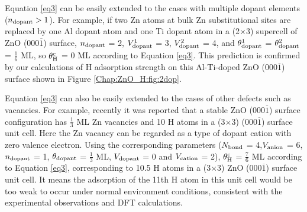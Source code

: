 Equation \ref{eq3} can be easily extended to the cases with multiple dopant elements ($n_{\textup{dopant}} > 1$). For example, if two Zn atoms at bulk Zn substitutional sites are replaced by one Al dopant atom and one Ti dopant atom in a (2$\times$3) supercell of ZnO (000$\overline{1}$) surface, $n_{\textup{dopant}}$ = 2,  $V_{\textup{dopant}}^1$ = 3, $V_{\textup{dopant}}^2$ = 4, and $\theta_{\textup{dopant}}^1$ = $\theta_{\textup{dopant}}^2$ = $\frac{1}{6}$ ML,  so $\theta_{\textup{H}}^{\textup{c}}$ = 0 ML according to Equation \ref{eq3}. This prediction is confirmed by our calculations of H adsorption strength on this Al-Ti-doped ZnO (000$\overline{1}$) surface shown in Figure \ref{Chap:ZnO_H:fig:2dop}. 

Equation \ref{eq3} can also be easily extended to the cases of other defects such as vacancies. For example, recently it was reported that a stable ZnO (000$\overline{1}$) surface configuration has $\frac{1}{3}$ ML Zn vacancies and 10 H atoms in a (3$\times$3) (000$\overline{1}$) surface unit cell\cite{Jacobs16ZnO}. Here the Zn vacancy can be regarded as a type of dopant cation with zero valence electron. Using the corresponding parameters ($N_{\textup{bond}}$ = 4,$V_{\textup{anion}}$ = 6, $n_{\textup{dopant}}$ = 1, $\theta_{\textup{dopant}}$ = $\frac{1}{3}$ ML, $V_{\textup{dopant}}$ = 0 and $V_{\textup{cation}}$ = 2), $\theta_{\textup{H}}^{\textup{c}}$ = $\frac{7}{6}$ ML according to Equation \ref{eq3}, corresponding to 10.5 H atoms in a (3$\times$3) ZnO (000$\overline{1}$) surface unit cell. It means the adsorption of the 11th H atom in this unit cell would be too weak to occur under normal environment conditions, consistent with the experimental observations and \ac{DFT} calculations\cite{Jacobs16ZnO}.

